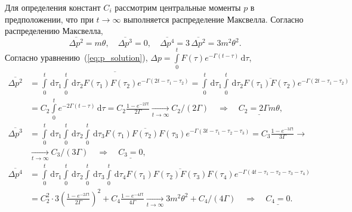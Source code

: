 \documentclass[a4paper, 12pt]{article}
\let\Gamma\varGamma
\let\intorig\int
\def\int{\intorig\limits}
\def\d{\,\mathrm{d}}
\begin{document}
Для определения констант $C_i$ рассмотрим центральные моменты $p$ в предположении, что при $t\to\infty$ выполняется распределение Максвелла. Согласно распределению Максвелла, 
$$\overline{\Delta p^2} = m\theta, \quad
\overline{\Delta p^3} = 0, \quad  
\overline{\Delta p^4} = 3\,\overline{\Delta p^2} = 3m^2\theta^2. $$
Согласно уравнению~(\ref{eq:p_solution}), $\Delta p = \int_0^t F(\tau) e^{-\Gamma(t-\tau)}\d \tau$,
$$ \begin{aligned} \overline{\Delta p^2} &= 
\overline{
\int_0^t\!\d\tau_1 \int_0^t\!\d\tau_2 
F(\tau_1)F(\tau_2) e^{-\Gamma(2t - \tau_1-\tau_2)}
} = 
\int_0^t\!\d\tau_1 \int_0^t\!\d\tau_2 
\overline{F(\tau_1)F(\tau_2)} e^{-\Gamma(2t - \tau_1 - \tau_2)} \\
&= C_2 \int_0^t e^{-2\Gamma(t-\tau)}\d\tau = 
C_2 \frac{1 - e^{-2\Gamma t}}{2\Gamma} \xrightarrow[t\to\infty]{} C_2/(2\Gamma)
\quad\Rightarrow\quad
\underline{C_2 = 2 \Gamma m\theta}, 
\end{aligned}$$
$$\begin{aligned}
\overline{\Delta p^3} &= 
\int_0^t\!\d\tau_1 \int_0^t\!\d\tau_2 \int_0^t\!\d\tau_3
\overline{F(\tau_1)F(\tau_2)F(\tau_3)}
e^{-\Gamma(3t - \tau_1 - \tau_2 - \tau_3)} = C_3 \frac{1-e^{-3\Gamma t}}{3\Gamma} \to \\
&\xrightarrow[t\to\infty]{} C_3/(3\Gamma) \quad \Rightarrow \quad \underline{C_3 = 0},
\end{aligned}$$
$$\begin{aligned}
\overline{\Delta p^4} &= 
\int_0^t\!\d\tau_1 \int_0^t\!\d\tau_2 \int_0^t\!\d\tau_3 \int_0^t\!\d\tau_4 
\overline{F(\tau_1)F(\tau_2)F(\tau_3)F(\tau_4)}
e^{-\Gamma(4t - \tau_1 - \tau_2 - \tau_3 - \tau_4)} 
\\ &= C_2^2\cdot 3\left(\frac{1-e^{-2\Gamma t}}{2\Gamma}\right)^2 + 
C_4 \frac{1-e^{-4\Gamma t}}{4\Gamma} \xrightarrow[t\to\infty]{} 3m^2\theta^2 + C_4/(4\Gamma) 
\quad \Rightarrow \quad
\underline{C_4 = 0}.
\end{aligned}$$
\end{document}
